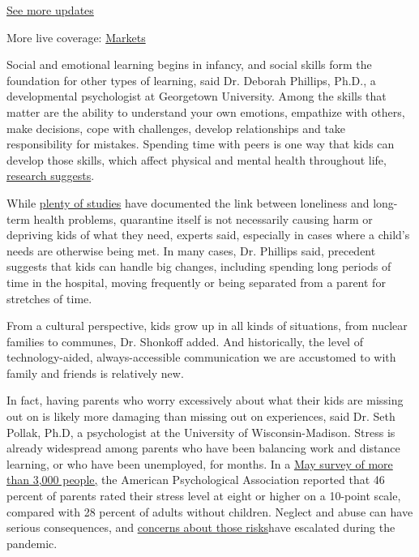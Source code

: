 \href{https://www.nytimes3xbfgragh.onion/2020/09/11/world/covid-19-coronavirus.html?action=click\&pgtype=Article\&state=default\&region=MAIN_CONTENT_1\&context=storylines_live_updates}{See
more updates}

More live coverage:
\href{https://www.nytimes3xbfgragh.onion/live/2020/09/11/business/stock-market-today-coronavirus?action=click\&pgtype=Article\&state=default\&region=MAIN_CONTENT_1\&context=storylines_live_updates}{Markets}

Social and emotional learning begins in infancy, and social skills form
the foundation for other types of learning, said Dr. Deborah Phillips,
Ph.D., a developmental psychologist at Georgetown University. Among the
skills that matter are the ability to understand your own emotions,
empathize with others, make decisions, cope with challenges, develop
relationships and take responsibility for mistakes. Spending time with
peers is one way that kids can develop those skills, which affect
physical and mental health throughout life,
\href{https://www.tandfonline.com/doi/abs/10.1080/10410236.2017.1384434?journalCode=hhth20}{research
suggests}.

While
\href{https://journals.sagepub.com/doi/10.1177/1745691614568352}{plenty
of studies} have documented the link between loneliness and long-term
health problems, quarantine itself is not necessarily causing harm or
depriving kids of what they need, experts said, especially in cases
where a child's needs are otherwise being met. In many cases, Dr.
Phillips said, precedent suggests that kids can handle big changes,
including spending long periods of time in the hospital, moving
frequently or being separated from a parent for stretches of time.

From a cultural perspective, kids grow up in all kinds of situations,
from nuclear families to communes, Dr. Shonkoff added. And historically,
the level of technology-aided, always-accessible communication we are
accustomed to with family and friends is relatively new.

In fact, having parents who worry excessively about what their kids are
missing out on is likely more damaging than missing out on experiences,
said Dr. Seth Pollak, Ph.D, a psychologist at the University of
Wisconsin-Madison. Stress is already widespread among parents who have
been balancing work and distance learning, or who have been unemployed,
for months. In a
\href{https://www.apa.org/news/press/releases/2020/05/stress-america-covid-19}{May
survey of more than 3,000 people,} the American Psychological
Association reported that 46 percent of parents rated their stress level
at eight or higher on a 10-point scale, compared with 28 percent of
adults without children. Neglect and abuse can have serious
consequences, and
\href{https://www.nytimes3xbfgragh.onion/2020/06/09/nyregion/coronavirus-nyc-child-abuse.html}{concerns
about those risks}have escalated during the pandemic.

